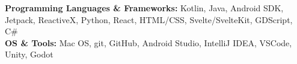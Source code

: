 

\begin{cvparagraph}

\textbf{Programming Languages \& Frameworks:} Kotlin, Java, Android SDK, Jetpack, ReactiveX, Python, React, HTML/CSS, Svelte/SvelteKit, GDScript, C\#
\\[2pt]
\textbf{OS \& Tools:} Mac OS, git, GitHub, Android Studio, IntelliJ IDEA, VSCode, Unity, Godot


\end{cvparagraph}
